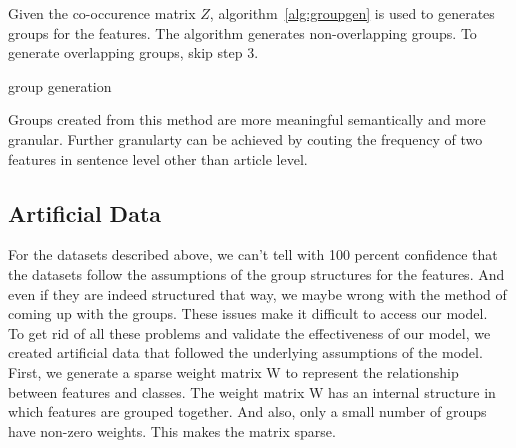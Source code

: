 \documentclass[11pt]{article}
\begin{document}
Given the co-occurence matrix $Z$, algorithm~\ref{alg:groupgen}  is used to generates groups for the features. The algorithm generates non-overlapping groups. To generate overlapping groups, skip step 3.

\begin{algorithm}
\caption{group generation}
\label{alg:groupgen}
\end{algorithm}

Groups created from this method are more meaningful semantically and more granular. Further granularty can be achieved by couting the frequency of two features in sentence level other than article level.

\subsection{Artificial Data}

For the datasets described above, we can't tell with 100 percent confidence that the datasets follow the assumptions of the group structures for the features. And even if they are indeed structured that way, we maybe wrong with the method of coming up with the groups. These issues make it difficult to access our model.\\ 

To get rid of all these problems and validate the effectiveness of our model, we created artificial data that followed the underlying assumptions of the model. First, we generate a sparse weight matrix W to represent the relationship between features and classes. The weight matrix W has an internal structure in which features are grouped together. And also, only a small number of groups have non-zero weights. This makes the matrix sparse.\\ 
\end{document}
